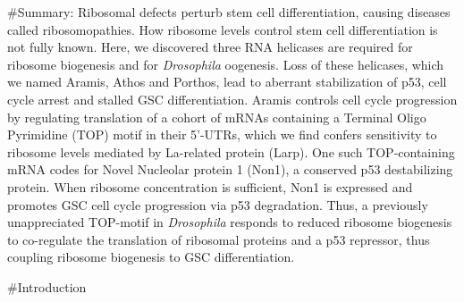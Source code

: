 \documentclass[12pt,twoside]{reedthesis}
\begin{document}
\#Summary: Ribosomal defects perturb stem cell differentiation,
causing diseases called ribosomopathies. How ribosome levels control
stem cell differentiation is not fully known. Here, we discovered three
RNA helicases are required for ribosome biogenesis and for \emph{Drosophila}
oogenesis. Loss of these helicases, which we named Aramis, Athos and
Porthos, lead to aberrant stabilization of p53, cell cycle arrest and
stalled GSC differentiation. Aramis controls cell cycle progression by
regulating translation of a cohort of mRNAs containing a Terminal Oligo
Pyrimidine (TOP) motif in their 5'-UTRs, which we find confers
sensitivity to ribosome levels mediated by La-related protein (Larp).
One such TOP-containing mRNA codes for {No}vel
{N}ucleolar protein 1 (Non1), a conserved p53 destabilizing
protein. When ribosome concentration is sufficient, Non1 is expressed
and promotes GSC cell cycle progression via p53 degradation. Thus, a
previously unappreciated TOP-motif in \emph{Drosophila} responds to reduced
ribosome biogenesis to co-regulate the translation of ribosomal proteins
and a p53 repressor, thus coupling ribosome biogenesis to GSC
differentiation.

\#Introduction
\end{document}
